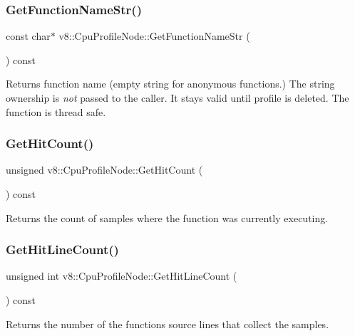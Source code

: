 \subsubsection{\texorpdfstring{Get\+Function\+Name\+Str()}{GetFunctionNameStr()}}
{\footnotesize\ttfamily const char$\ast$ v8\+::\+Cpu\+Profile\+Node\+::\+Get\+Function\+Name\+Str (\begin{DoxyParamCaption}{ }\end{DoxyParamCaption}) const}

Returns function name (empty string for anonymous functions.) The string ownership is {\itshape not} passed to the caller. It stays valid until profile is deleted. The function is thread safe. \mbox{\label{classv8_1_1CpuProfileNode_a56d1cece4ee808022b9eb7f3eb66b93a}} 
\subsubsection{\texorpdfstring{Get\+Hit\+Count()}{GetHitCount()}}
{\footnotesize\ttfamily unsigned v8\+::\+Cpu\+Profile\+Node\+::\+Get\+Hit\+Count (\begin{DoxyParamCaption}{ }\end{DoxyParamCaption}) const}

Returns the count of samples where the function was currently executing. \mbox{\label{classv8_1_1CpuProfileNode_a5b956d1b3aea5a9710632b28b1e85dfd}} 
\subsubsection{\texorpdfstring{Get\+Hit\+Line\+Count()}{GetHitLineCount()}}
{\footnotesize\ttfamily unsigned int v8\+::\+Cpu\+Profile\+Node\+::\+Get\+Hit\+Line\+Count (\begin{DoxyParamCaption}{ }\end{DoxyParamCaption}) const}

Returns the number of the function\textquotesingle{}s source lines that collect the samples. \mbox{\label{classv8_1_1CpuProfileNode_a6616c8d1893da19183d57e6488eb2743}} 
